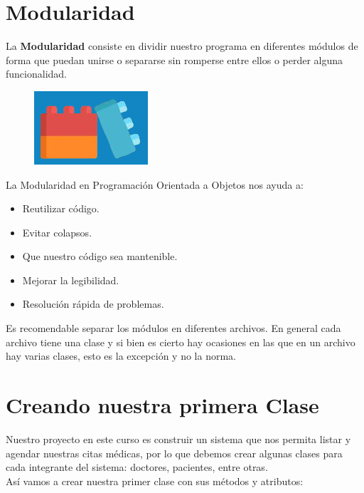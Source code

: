 \documentclass{article}
\begin{document}
\section{Modularidad}%
La \textbf{Modularidad} consiste en dividir nuestro programa en diferentes módulos de
forma que puedan unirse o separarse sin romperse entre ellos o perder alguna
funcionalidad.\\

\begin{figure}[h!]
  \centering
  \includegraphics[scale=0.7]{./Pictures/008_modularidad.png}
\end{figure}

La Modularidad en Programación Orientada a Objetos nos ayuda a:\\

\begin{itemize}
  \item Reutilizar código.
  \item Evitar colapsos.
  \item Que nuestro código sea mantenible.
  \item Mejorar la legibilidad.
  \item Resolución rápida de problemas.
\end{itemize}

Es recomendable separar los módulos en diferentes archivos. En general cada
archivo tiene una clase y si bien es cierto hay ocasiones en las que en un
archivo hay varias clases, esto es la excepción y no la norma.\\

\section{Creando nuestra primera Clase}%
Nuestro proyecto en este curso es construir un sistema que nos permita listar y
agendar nuestras citas médicas, por lo que debemos crear algunas clases para
cada integrante del sistema: doctores, pacientes, entre otras.\\

Así vamos a crear nuestra primer clase con sus métodos y atributos:\\
\end{document}
